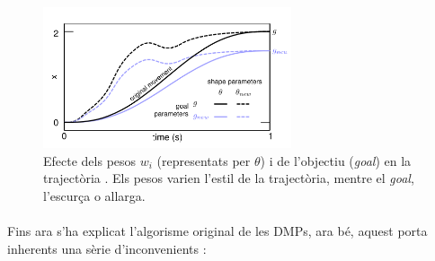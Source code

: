 \documentclass[12pt,a4paper,final,twoside]{article}
\begin{document}
\begin{figure}[h]
\centering
\includegraphics[width=0.65\textwidth]{Imatges/effect-of-shape-parameters}
\caption[Efecte dels pesos $w_i$ (representats per $\theta$) i de l'objectiu (\textit{goal})]{Efecte dels pesos $w_i$ (representats per $\theta$) i de l'objectiu (\textit{goal}) en la trajectòria \cite{Stulp2011}. Els pesos varien l'estil de la trajectòria, mentre el \textit{goal}, l'escurça o allarga.}
\label{fig:ffect-of-shape-parameters}
\end{figure}


\paragraph{}Fins ara s'ha explicat l'algorisme original de les DMPs, ara bé, aquest porta inherents una sèrie d'inconvenients \cite{Pastor2009a}:
\end{document}
